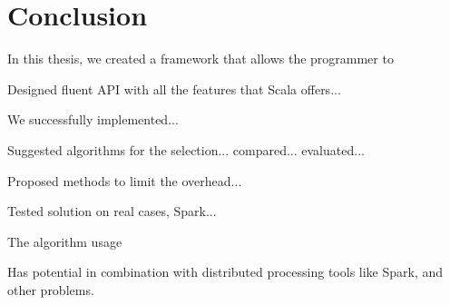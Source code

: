 \chapter*{Conclusion}

In this thesis, we created a framework that allows the programmer to 

Designed fluent API with all the features that Scala offers...

We successfully implemented...

Suggested algorithms for the selection... compared... evaluated...

Proposed methods to limit the overhead...

Tested solution on real cases, Spark...

The algorithm usage 

Has potential in combination with distributed processing tools like Spark, and other problems.